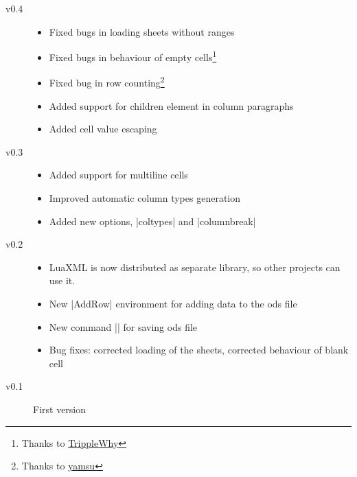 \documentclass{ltxdoc}
\newcommand\ods{\textsf{ods}\xspace}
\begin{document}
\begin{description}
\item[v0.4]
\begin{itemize}
	\item Fixed bugs in loading sheets without ranges
	\item Fixed bugs in behaviour of empty cells\footnote{Thanks to \href{https://github.com/TripleWhy}{TrippleWhy}}
  \item Fixed bug in row counting\footnote{Thanks to \href{https://github.com/yamsu}{yamsu}}
	\item Added support for children element in column paragraphs
	\item Added cell value escaping
\end{itemize}
\item[v0.3]
\begin{itemize}
  \item Added support for multiline cells
  \item Improved automatic column types generation
  \item Added new options, |coltypes| and |columnbreak|
\end{itemize}
\item[v0.2] 
\begin{itemize}
 \item LuaXML is now distributed as separate library, so other projects can use it.
 \item New |AddRow| environment for adding data to the \ods file
 \item New command |\savespreadsheet| for saving \ods file
 \item Bug fixes: corrected loading of the sheets, corrected behaviour of blank cell 
\end{itemize}
\item[v0.1] First version
\end{description}
\end{document}
